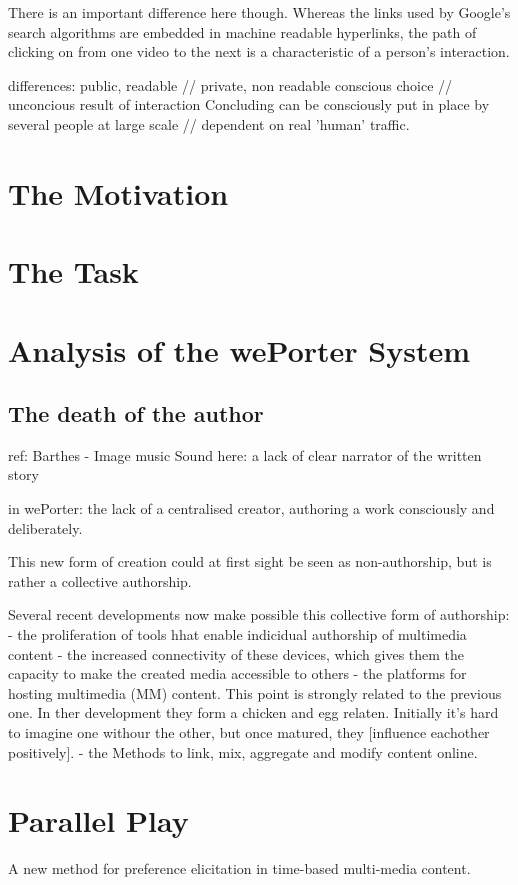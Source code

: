 There is an important difference here though. Whereas the links used by Google's search algorithms are embedded in machine readable hyperlinks, the path of clicking on from one video to the next is a characteristic of a person's interaction. 

differences:
	public, readable // private, non readable
	conscious choice // unconcious result of interaction
	Concluding
		can be consciously put in place by several people at large scale // dependent on real 'human' traffic.
		

\section{The Motivation}
\section{The Task}


\section{Analysis of the wePorter System}

\subsection{The death of the author}
ref: Barthes - Image music Sound
here: a lack of clear narrator of the written story

in wePorter: the lack of a centralised creator, authoring a work consciously and deliberately.

This new form of creation could at first sight be seen as non-authorship, but is rather a collective authorship. 

Several recent developments now make possible this collective form of authorship:
- the proliferation of tools hhat enable indicidual authorship of multimedia content
- the increased connectivity of these devices, which gives them the capacity to make the created media accessible to others
- the platforms for hosting multimedia (MM) content. This point is strongly related to the previous one. In ther development they form a chicken and egg relaten. Initially it's hard to imagine one withour the other, but once matured, they [influence eachother positively].
- the Methods to link, mix, aggregate and modify content online.

\section{Parallel Play}
A new method for preference elicitation in time-based multi-media content.


